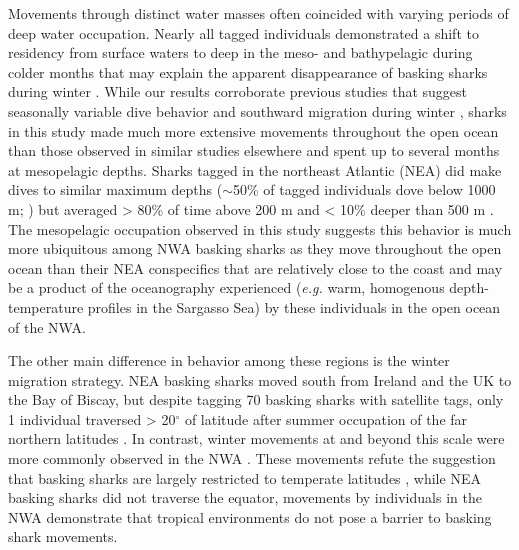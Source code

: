 Movements through distinct water masses often coincided with varying periods of deep water occupation. Nearly all tagged individuals demonstrated a shift to residency from surface waters to deep in the meso- and bathypelagic during colder months that may explain the apparent disappearance of basking sharks during winter \citep{Parker1954}. While our results corroborate previous studies that suggest seasonally variable dive behavior \citep{Sims2003} and southward migration during winter \citep{Doherty2017}, sharks in this study made much more extensive movements throughout the open ocean than those observed in similar studies elsewhere \citep{Doherty2017} and spent up to several months at mesopelagic depths. Sharks tagged in the northeast Atlantic (NEA) did make dives to similar maximum depths ($\sim$50\% of tagged individuals dove below 1000 m; \citet{Doherty2017}) but averaged > 80\% of time above 200 m and < 10\% deeper than 500 m \citep{Sims2003, Doherty2017}. The mesopelagic occupation observed in this study suggests this behavior is much more ubiquitous among NWA basking sharks as they move throughout the open ocean than their NEA conspecifics that are relatively close to the coast and may be a product of the oceanography experienced (\emph{e.g.} warm, homogenous depth-temperature profiles in the Sargasso Sea) by these individuals in the open ocean of the NWA. 

The other main difference in behavior among these regions is the winter migration strategy. NEA basking sharks moved south from Ireland and the UK to the Bay of Biscay, but despite tagging 70 basking sharks with satellite tags, only 1 individual traversed > 20$^{\circ}$ of latitude after summer occupation of the far northern latitudes \citep{Doherty2017}. In contrast, winter movements at and beyond this scale were more commonly observed in the NWA \citep[][ and this study]{Skomal2009}. These movements refute the suggestion that basking sharks are largely restricted to temperate latitudes \citep{Sims1999,Sims2003,Gore2008,Doherty2017}, while NEA basking sharks did not traverse the equator, movements by individuals in the NWA demonstrate that tropical environments do not pose a barrier to basking shark movements.

